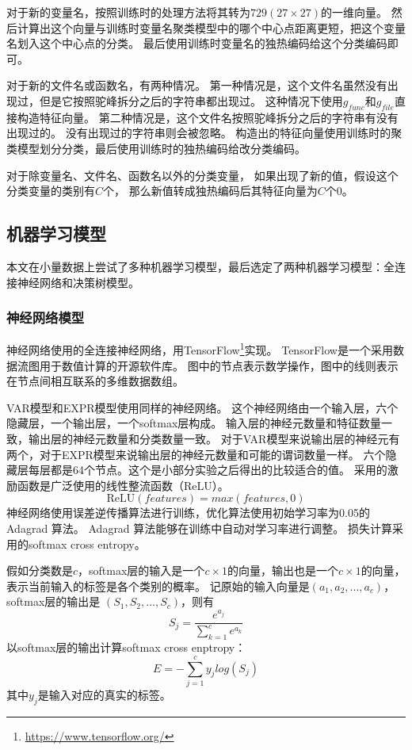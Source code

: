 对于新的变量名，按照训练时的处理方法将其转为$729 (27 \times 27)$的一维向量。
然后计算出这个向量与训练时变量名聚类模型中的哪个中心点距离更短，把这个变量名划入这个中心点的分类。
最后使用训练时变量名的独热编码给这个分类编码即可。

对于新的文件名或函数名，有两种情况。
第一种情况是，这个文件名虽然没有出现过，但是它按照驼峰拆分之后的字符串都出现过。
这种情况下使用$g_{func}$和$g_{file}$直接构造特征向量。
第二种情况是，这个文件名按照驼峰拆分之后的字符串有没有出现过的。
没有出现过的字符串则会被忽略。
构造出的特征向量使用训练时的聚类模型划分分类，最后使用训练时的独热编码给改分类编码。

对于除变量名、文件名、函数名以外的分类变量，
如果出现了新的值，假设这个分类变量的类别有$C$个，
那么新值转成独热编码后其特征向量为$C$个0。

\subsection{机器学习模型}

本文在小量数据上尝试了多种机器学习模型，最后选定了两种机器学习模型：全连接神经网络和决策树模型。

\subsubsection{神经网络模型}

神经网络使用的全连接神经网络，用TensorFlow\footnote{\url{https://www.tensorflow.org/}}实现。
TensorFlow是一个采用数据流图用于数值计算的开源软件库。
图中的节点表示数学操作，图中的线则表示在节点间相互联系的多维数据数组。

VAR模型和EXPR模型使用同样的神经网络。
这个神经网络由一个输入层，六个隐藏层，一个输出层，一个softmax层构成。
输入层的神经元数量和特征数量一致，输出层的神经元数量和分类数量一致。
对于VAR模型来说输出层的神经元有两个，对于EXPR模型来说输出层的神经元数量和可能的谓词数量一样。
六个隐藏层每层都是64个节点。这个是小部分实验之后得出的比较适合的值。
采用的激励函数是广泛使用的线性整流函数（ReLU）。
$$
\mathrm{ReLU}(features) = max(features, 0)
$$
神经网络使用误差逆传播算法进行训练，优化算法使用初始学习率为0.05的 Adagrad 算法。
Adagrad 算法能够在训练中自动对学习率进行调整。
损失计算采用的softmax cross entropy。

假如分类数是$c$，softmax层的输入是一个$c \times 1$的向量，输出也是一个$c \times 1$的向量，
表示当前输入的标签是各个类别的概率。
记原始的输入向量是$(a_1, a_2, ..., a_c)$，softmax层的输出是
$(S_1, S_2, ..., S_c)$，则有
$$
S_j = \frac{e^{a_j}}{\sum_{k=1}^c{e^{a_k}}}
$$
以softmax层的输出计算softmax cross enptropy：
$$
E = -\sum_{j = 1}^{c}{y_jlog(S_j)}
$$
其中$y_j$是输入对应的真实的标签。

